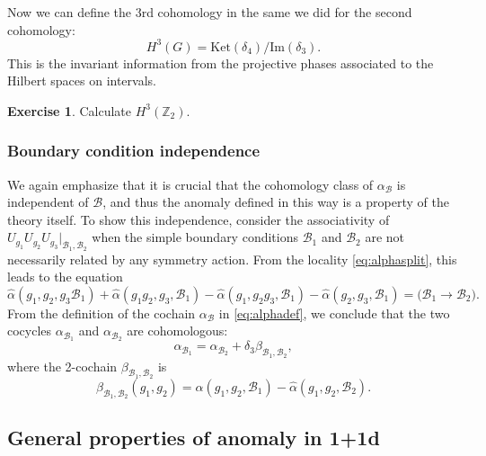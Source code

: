 \documentclass[
]{scrartcl}
\numberwithin{equation}{section}
\theoremstyle{definition}
\theoremstyle{definition}
\theoremstyle{definition}
\newtheorem{exercise}{Exercise}[section]
\theoremstyle{definition}
\theoremstyle{remark}
\begin{document}
Now we can define the 3rd cohomology in the same we did for the second cohomology:
\begin{equation}
    \label{eq:H3g}
    H^3(G) = \mathrm{Ket}(\delta_4)/\mathrm{Im}(\delta_3).
\end{equation}
This is the invariant information from the projective phases associated to the Hilbert spaces on intervals.

\begin{exercise}
Calculate \(H^3(\mathbb{Z}_2)\).
\end{exercise}

\hypertarget{boundary-condition-independence}{%
\subsubsection{Boundary condition independence}\label{boundary-condition-independence}}

We again emphasize that it is crucial that the cohomology class of \(\alpha_{\mathcal{B}}\) is independent of \(\mathcal{B}\), and thus the anomaly defined in this way is a property of the theory itself.
To show this independence, consider the associativity of
\(U_{g_1}U_{g_2}U_{g_3}|_{\mathcal{B}_1,\mathcal{B}_2}\) when the simple boundary conditions \(\mathcal{B}_1\) and \(\mathcal{B}_2\) are not necessarily related by any symmetry action.
From the locality \eqref{eq:alphasplit}, this leads to the equation
\begin{equation}
    \label{eq:assocB1B2}
    \hat\alpha(g_1,g_2,g_3\mathcal{B}_1) + \hat\alpha(g_1g_2,g_3,\mathcal{B}_1) - \hat\alpha(g_1,g_2g_3,\mathcal{B}_1) - \hat\alpha(g_2,g_3,\mathcal{B}_1) = \text{($\mathcal{B}_1 \to \mathcal{B}_2$)}.
\end{equation}
From the definition of the cochain \(\alpha_{\mathcal{B}}\) in \eqref{eq:alphadef}, we conclude that the two cocycles \(\alpha_{\mathcal{B}_1}\) and \(\alpha_{\mathcal{B}_2}\) are cohomologous:
\begin{equation}
    \label{eq:B1B2equiv}
    \alpha_{\mathcal{B}_1} = \alpha_{\mathcal{B}_2} + \delta_3 \beta_{\mathcal{B}_1,\mathcal{B}_2},
\end{equation}
where the 2-cochain \(\beta_{\mathcal{B}_1,\mathcal{B}_2}\) is
\begin{equation}
    \label{eq:betaB1B2}
    \beta_{\mathcal{B}_1,\mathcal{B}_2}(g_1,g_2) = \hat\alpha(g_1,g_2,\mathcal{B}_1) - \hat\alpha(g_1,g_2,\mathcal{B}_2).
\end{equation}

\hypertarget{property}{%
\subsection{General properties of anomaly in 1+1d}\label{property}}
\end{document}
